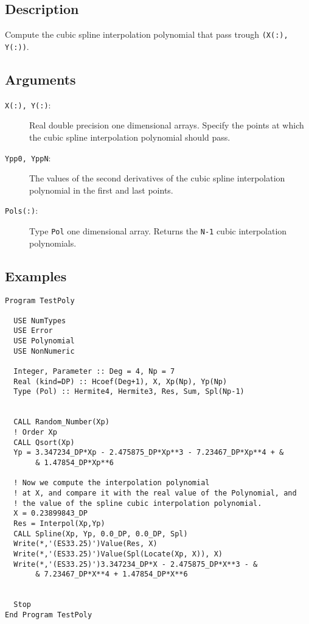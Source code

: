 \subsection{Description}

Compute the cubic spline interpolation polynomial that pass trough
\texttt{(X(:), Y(:))}.

\subsection{Arguments}

\begin{description}
\item[\texttt{X(:), Y(:)}:] Real double precision one dimensional
  arrays. Specify the points at which the cubic spline interpolation
  polynomial should pass. 
\item[\texttt{Ypp0, YppN}:] The values of the second derivatives of
  the cubic spline interpolation polynomial in the first and last points.
\item[\texttt{Pols(:)}:] Type \texttt{Pol} one dimensional
  array. Returns the \texttt{N-1} cubic interpolation polynomials.
\end{description}

\subsection{Examples}

\begin{verbatim}
Program TestPoly

  USE NumTypes
  USE Error
  USE Polynomial
  USE NonNumeric

  Integer, Parameter :: Deg = 4, Np = 7
  Real (kind=DP) :: Hcoef(Deg+1), X, Xp(Np), Yp(Np)
  Type (Pol) :: Hermite4, Hermite3, Res, Sum, Spl(Np-1)


  CALL Random_Number(Xp)
  ! Order Xp
  CALL Qsort(Xp)
  Yp = 3.347234_DP*Xp - 2.475875_DP*Xp**3 - 7.23467_DP*Xp**4 + &
       & 1.47854_DP*Xp**6

  ! Now we compute the interpolation polynomial
  ! at X, and compare it with the real value of the Polynomial, and
  ! the value of the spline cubic interpolation polynomial.
  X = 0.23899843_DP
  Res = Interpol(Xp,Yp)
  CALL Spline(Xp, Yp, 0.0_DP, 0.0_DP, Spl)
  Write(*,'(ES33.25)')Value(Res, X)
  Write(*,'(ES33.25)')Value(Spl(Locate(Xp, X)), X)
  Write(*,'(ES33.25)')3.347234_DP*X - 2.475875_DP*X**3 - &
       & 7.23467_DP*X**4 + 1.47854_DP*X**6


  Stop
End Program TestPoly
\end{verbatim}


